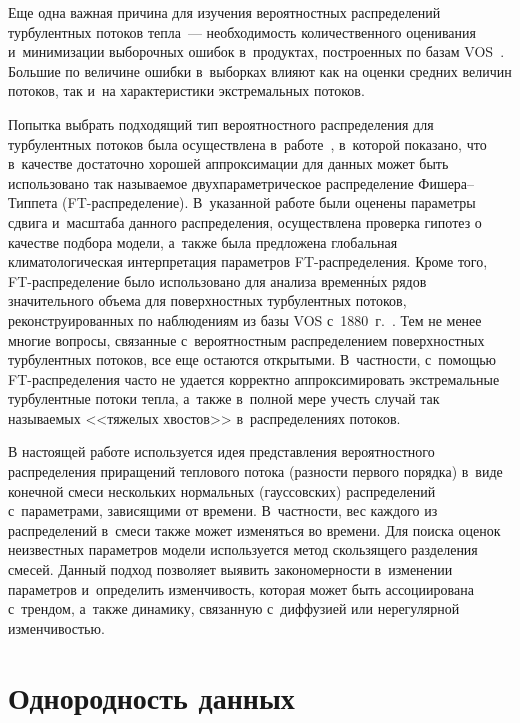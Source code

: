 \begin{multicols}{2}
Еще одна важная причина для изучения вероятностных распределений
турбулентных потоков теп\-ла~--- необходимость количественного
оценивания и~минимизации выборочных ошибок в~продуктах,
построенных по базам VOS~\cite{Gulev2007a,Gulev2007b}. Большие по
величине ошибки в~выборках влияют как на оценки средних величин
потоков, так и~на характеристики экстремальных потоков.


Попытка выбрать подходящий тип вероятностного распределения для
турбулентных потоков была осуществлена в~работе~\cite{Gulev2012}, 
в~которой показано, что в~качестве достаточно хорошей аппроксимации
для данных может быть использовано так назы\-ва\-емое
двухпараметрическое распределение Фи\-ше\-ра--Тип\-пе\-та
(FT-рас\-пре\-де\-ле\-ние). В~указанной работе были оценены параметры сдвига
и~масштаба данного распределения, осуществлена проверка гипотез о
качестве подбора модели, а~также была предложена глобальная
климатологическая интерпретация параметров FT-рас\-пре\-де\-ле\-ния. Кроме
того, FT-рас\-пре\-де\-ле\-ние было использовано для анализа временн$\acute{\mbox{ы}}$х рядов
значительного объема для поверхностных турбулентных потоков,
реконструированных по наблюдениям из базы VOS с~1880~г.~\cite{Gulev2013}. 
Тем не менее многие вопросы, связанные 
с~вероятностным распределением поверхностных турбулентных потоков, все
еще остаются открытыми. В~част\-ности, с~по\-мощью FT-рас\-пре\-де\-ле\-ния
часто не удается корректно аппроксимировать экстремальные
турбулентные потоки тепла, а~также в~полной мере учесть случай так
называемых <<тяжелых хвостов>> в~распределениях потоков.




В настоящей работе используется идея представления
вероятностного распределения приращений теплового потока
(разности первого порядка) в~виде конечной смеси нескольких
нормальных (гауссовских) распределений с~параметрами,
зависящими от времени. В~частности, вес каждого из распределений
в~смеси также может изменяться во времени. Для поиска оценок
неизвестных па\-ра\-мет\-ров модели используется метод скользящего
разделения смесей. Данный подход позволяет выявить
закономерности в~изменении параметров и~определить изменчивость,
которая может быть ассоциирована с~трендом, а~также динамику,
связанную с~диффузией или нерегулярной изменчивостью.

\section{Однородность данных}


\end{multicols}
